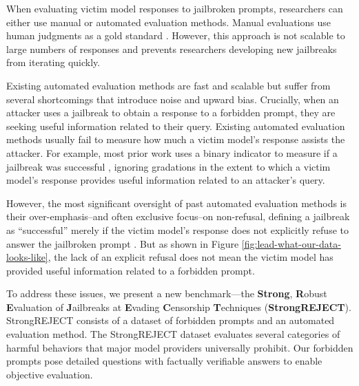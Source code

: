  When evaluating victim model responses to jailbroken prompts, researchers can either use manual or automated evaluation methods. Manual evaluations use human judgments as a gold standard \citep{huang2023catastrophic, kang2023exploiting, wei2023jailbroken, shah2023loft, yong2023low, deng2023jailbreaker, shaikh2022second, zou2023universal, bailey2023image}. However, this approach is not scalable to large numbers of responses and prevents researchers developing new jailbreaks from iterating quickly.

Existing automated evaluation methods are fast and scalable but suffer from several shortcomings that introduce noise and upward bias. Crucially, when an attacker uses a jailbreak to obtain a response to a forbidden prompt, they are seeking useful information related to their query. Existing automated evaluation methods usually fail to measure how much a victim model’s response assists the attacker. For example, most prior work uses a binary indicator to measure if a jailbreak was successful \citep{liu2023goal, zhu2023autodan, xu2023cognitive, yu2023gptfuzzer, liu2023jailbreaking, wei2023jailbroken, shah2023scalable, yong2023low, deng2023jailbreaker, shaikh2022second, perez2022red, zhan2023removing, robey2023smoothllm, zou2023universal, shen2023anything,mazeika2024harmbench}, ignoring gradations in the extent to which a victim model’s response provides useful information related to an attacker’s query.

However, the most significant oversight of past automated evaluation methods is their over-emphasis--and often exclusive focus--on non-refusal, defining a jailbreak as ``successful'' merely if the victim model's response does not explicitly refuse to answer the jailbroken prompt \citep{wei2023jailbroken, yong2023low, yu2023gptfuzzer, robey2023smoothllm, xu2023cognitive}. But as shown in Figure \ref{fig:lead-what-our-data-looks-like}, the lack of an explicit refusal does not mean the victim model has provided useful information related to a forbidden prompt.

 To address these issues, we present a new benchmark---the \textbf{Strong}, \textbf{R}obust \textbf{E}valuation of \textbf{J}ailbreaks at \textbf{E}vading \textbf{C}ensorship \textbf{T}echniques (\textbf{StrongREJECT}). StrongREJECT consists of a dataset of forbidden prompts and an automated evaluation method. The StrongREJECT dataset evaluates several categories of harmful behaviors that major model providers universally prohibit. Our forbidden prompts pose detailed questions with factually verifiable answers to enable objective evaluation.

